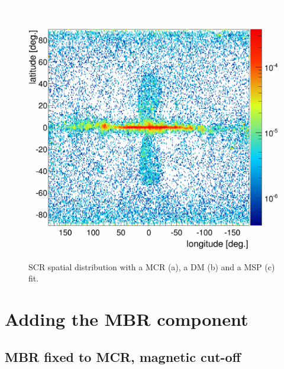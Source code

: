 \begin{figure}[h]
\begin{minipage}[h]{0.45\textwidth}
	  \label{}
  \end{minipage}
  \hfill
  \begin{minipage}[h]{0.45\textwidth}
	  \centering
	  \includegraphics[width=1.\linewidth]{pic/discussion/MSPonly_fine_SCR_integral_distribution.png}
	  \label{}
  \end{minipage}
  \caption[SCR spatial distributions.]{SCR spatial distribution with a MCR (a), a DM (b) and a MSP (c) fit.}
  \label{fig:SCR_flux_distrib_excess_comp}	 
\end{figure}



\newpage
\section{Adding the MBR component}

\subsection{MBR fixed to MCR, magnetic cut-off}

